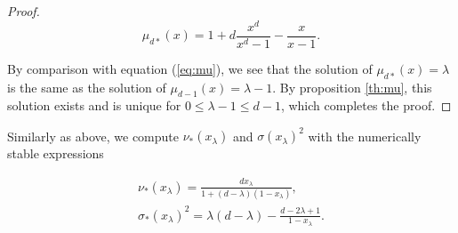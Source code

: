 \documentclass{article}
\begin{document}
\begin{proof}
\label{th:mustar}
\begin{equation}
\label{eq:mustar}
\mu_{d*}(x) = 1 + d\frac{x^d}{x^d-1} - \frac{x}{x-1}.
\end{equation}

By comparison with equation (\ref{eq:mu}), we see that the solution of
$\mu_{d*}(x) = \lambda$ is the same as the solution of $\mu_{d-1}(x) =
\lambda - 1$. By proposition \ref{th:mu}, this solution exists and is
unique for $0 \leq \lambda -1 \leq d-1$, which completes the proof.
\end{proof}

Similarly as above, we compute $\nu_*(x_\lambda)$ and
$\sigma(x_\lambda)^2$ with the numerically stable expressions

\begin{gather}
\label{eq:nustar}
\nu_*(x_\lambda) = \frac{dx_\lambda}{1+(d-\lambda)(1-x_\lambda)}, \\
\sigma_*(x_\lambda)^2 = \lambda(d-\lambda) -
  \frac{d-2\lambda+1}{1-x_\lambda}. \label{eq:sigmastar}
\end{gather}
\end{document}
